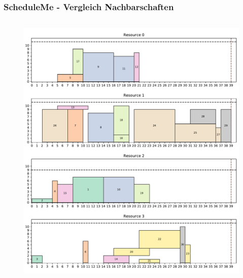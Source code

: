 \documentclass[aspectratio=169]{beamer}
\begin{document}
\begin{frame}
	\frametitle{ScheduleMe - Vergleich Nachbarschaften}
	
	\vspace{-6pt}
	
	
	\vspace{-10pt}
	\begin{columns}[c] %
		
		
		\vspace{-10pt}
		
		\begin{figure}
			\centering
			\includegraphics[scale=0.25]{example_plot_sa_api.pdf}
		\end{figure}	
		
		
		\vspace{-10pt}
		

\end{columns}
\end{frame}
\end{document}
